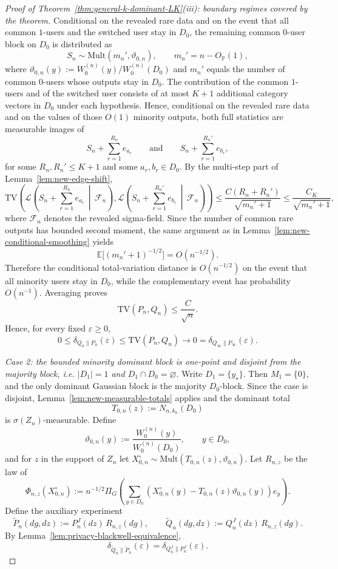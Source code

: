 \documentclass{article}
\newcommand{\TV}{\mathrm{TV}}
\newcommand{\Mult}{\mathrm{Mult}}
\newcommand{\E}{\mathbb E}
\newcommand{\Pbb}{\mathbb P}
\newcommand{\1}{\mathbf 1}
\begin{document}
\begin{proof}[Proof of Theorem~\ref{thm:general-k-dominant-LK}(iii): boundary regimes covered by the theorem]
Conditional on the revealed rare data and on the event that all common $1$-users and the switched user stay in
$D_0$, the remaining common $0$-user block on $D_0$ is distributed as
\[
S_n\sim \Mult(m_n',\vartheta_{0,n}),
\qquad
m_n'=n-O_{\Pbb}(1),
\]
where $\vartheta_{0,n}(y):=W_0^{(n)}(y)/W_0^{(n)}(D_0)$ and $m_n'$ equals the number of common $0$-users whose
outputs stay in $D_0$. The contribution of the common $1$-users and of the switched user consists of at most
$K+1$ additional category vectors in $D_0$ under each hypothesis. Hence, conditional on the revealed rare data and
on the values of those $O(1)$ minority outputs, both full statistics are measurable images of
\[
S_n+\sum_{r=1}^{R_n} e_{a_r}
\qquad\text{and}\qquad
S_n+\sum_{r=1}^{R_n'} e_{b_r},
\]
for some $R_n,R_n'\le K+1$ and some $a_r,b_r\in D_0$. By the multi-step part of
Lemma~\ref{lem:new-edge-shift},
\[
\TV\!\left(
\mathcal L\!\left(S_n+\sum_{r=1}^{R_n} e_{a_r}\,\middle|\,\mathcal F_n\right),
\mathcal L\!\left(S_n+\sum_{r=1}^{R_n'} e_{b_r}\,\middle|\,\mathcal F_n\right)
\right)
\le
\frac{C(R_n+R_n')}{\sqrt{m_n'+1}}
\le
\frac{C_K}{\sqrt{m_n'+1}},
\]
where $\mathcal F_n$ denotes the revealed sigma-field. Since the number of common rare outputs has bounded second
moment, the same argument as in Lemma~\ref{lem:new-conditional-smoothing} yields
\[
\E\bigl[(m_n'+1)^{-1/2}\bigr]=O(n^{-1/2}).
\]
Therefore the conditional total-variation distance is $O(n^{-1/2})$ on the event that all minority users stay in
$D_0$, while the complementary event has probability $O(n^{-1})$. Averaging proves
\[
\TV(P_n,Q_n)\le \frac{C}{\sqrt n}.
\]
Hence, for every fixed $\varepsilon\ge 0$,
\[
0\le \delta_{Q_n\|P_n}(\varepsilon)\le \TV(P_n,Q_n)\to 0
=\delta_{Q_\infty\|P_\infty}(\varepsilon).
\]

\smallskip
\emph{Case 2: the bounded minority dominant block is one-point and disjoint from the majority block, i.e.
$|D_1|=1$ and $D_1\cap D_0=\varnothing$.}
Write $D_1=\{y_\star\}$. Then $M_1=\{0\}$, and the only dominant Gaussian block is the majority $D_0$-block.
Since the case is disjoint, Lemma~\ref{lem:new-measurable-totals} applies and the dominant total
\[
T_{0,n}(z):=N_{n,k_n}(D_0)
\]
is $\sigma(Z_n)$-measurable. Define
\[
\vartheta_{0,n}(y):=\frac{W_0^{(n)}(y)}{W_0^{(n)}(D_0)},
\qquad y\in D_0,
\]
and for $z$ in the support of $Z_n$ let $X_{0,n}^\circ\sim \Mult(T_{0,n}(z),\vartheta_{0,n})$. Let $R_{n,z}$ be
the law of
\[
\Phi_{n,z}(X_{0,n}^\circ)
:=
n^{-1/2}\Pi_G\!\left(
\sum_{y\in D_0}(X_{0,n}^\circ(y)-T_{0,n}(z)\vartheta_{0,n}(y))e_y
\right).
\]
Define the auxiliary experiment
\[
\widetilde P_n(dg,dz):=P_n^J(dz)\,R_{n,z}(dg),
\qquad
\widetilde Q_n(dg,dz):=Q_n^J(dz)\,R_{n,z}(dg).
\]
By Lemma~\ref{lem:privacy-blackwell-equivalence},
\[
\delta_{\widetilde Q_n\|\widetilde P_n}(\varepsilon)=\delta_{Q_n^J\|P_n^J}(\varepsilon).
\]


\end{proof}
\end{document}

